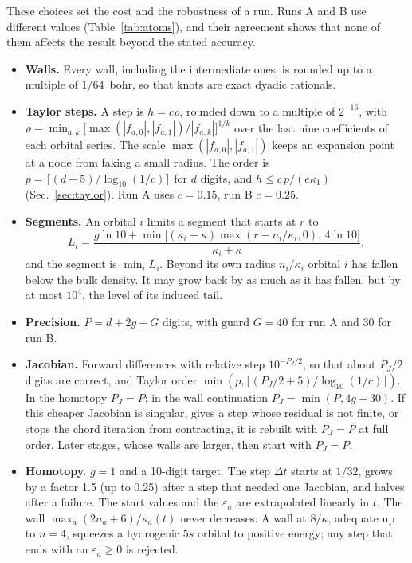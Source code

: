 \documentclass[aps,pra,reprint,superscriptaddress,amsmath,amssymb,longbibliography]{revtex4-2}
\begin{document}
These choices set the cost and the robustness of a run. Runs A and B use different values (Table~\ref{tab:atoms}), and their agreement shows that none of them affects the result beyond the stated accuracy.
\begin{itemize}
\item \textbf{Walls.} Every wall, including the intermediate ones, is rounded up to a multiple of $1/64$~bohr, so that knots are exact dyadic rationals.
\item \textbf{Taylor steps.} A step is $h=c\rho$, rounded down to a multiple of $2^{-16}$, with
$\rho=\min_{a,k}\big[\max(|f_{a,0}|,|f_{a,1}|)/|f_{a,k}|\big]^{1/k}$ over the last nine coefficients of each orbital series. The scale $\max(|f_{a,0}|,|f_{a,1}|)$ keeps an expansion point at a node from faking a small radius. The order is $p=\lceil(d+5)/\log_{10}(1/c)\rceil$ for $d$ digits, and $h\le c\,p/(e\kappa_1)$ (Sec.~\ref{sec:taylor}). Run A uses $c=0.15$, run B $c=0.25$.
\item \textbf{Segments.} An orbital $i$ limits a segment that starts at $r$ to
\begin{equation*}
L_i=\frac{g\ln10+\min\!\big[(\kappa_i-\kappa)\max(r-n_i/\kappa_i,0),\,4\ln10\big]}{\kappa_i+\kappa},
\end{equation*}
and the segment is $\min_iL_i$. Beyond its own radius $n_i/\kappa_i$ orbital $i$ has fallen below the bulk density. It may grow back by as much as it has fallen, but by at most $10^4$, the level of its induced tail.
\item \textbf{Precision.} $P=d+2g+G$ digits, with guard $G=40$ for run A and $30$ for run B.
\item \textbf{Jacobian.} Forward differences with relative step $10^{-P_J/2}$, so that about $P_J/2$ digits are correct, and Taylor order $\min(p,\lceil(P_J/2+5)/\log_{10}(1/c)\rceil)$. In the homotopy $P_J=P$; in the wall continuation $P_J=\min(P,4g+30)$. If this cheaper Jacobian is singular, gives a step whose residual is not finite, or stops the chord iteration from contracting, it is rebuilt with $P_J=P$ at full order. Later stages, whose walls are larger, then start with $P_J=P$.
\item \textbf{Homotopy.} $g=1$ and a 10-digit target. The step $\Delta t$ starts at $1/32$, grows by a factor 1.5 (up to 0.25) after a step that needed one Jacobian, and halves after a failure. The start values and the $\varepsilon_a$ are extrapolated linearly in $t$. The wall $\max_a(2n_a+6)/\kappa_a(t)$ never decreases. A wall at $8/\kappa$, adequate up to $n=4$, squeezes a hydrogenic $5s$ orbital to positive energy; any step that ends with an $\varepsilon_a\ge0$ is rejected.

\end{itemize}
\end{document}
